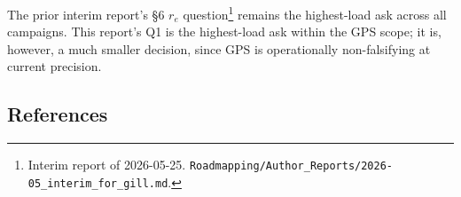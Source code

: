 \documentclass[
  11pt,
]{article}
\begin{document}
The prior interim report's §6 \(r_e\) question\footnote{Interim report
  of 2026-05-25.
  \texttt{Roadmapping/Author\_Reports/2026-05\_interim\_for\_gill.md}.}
remains the highest-load ask across all campaigns. This report's Q1 is
the highest-load ask within the GPS scope; it is, however, a much
smaller decision, since GPS is operationally non-falsifying at current
precision.

\hypertarget{references}{%
\subsection{References}\label{references}}
\end{document}
